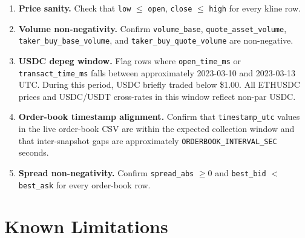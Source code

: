 \documentclass[11pt,a4paper]{article}
\begin{document}
\begin{enumerate}
  \item \textbf{Price sanity.}
        Check that \texttt{low} $\leq$ \texttt{open},
        \texttt{close} $\leq$ \texttt{high} for every kline row.

  \item \textbf{Volume non-negativity.}
        Confirm \texttt{volume\_base}, \texttt{quote\_asset\_volume},
        \texttt{taker\_buy\_base\_volume}, and
        \texttt{taker\_buy\_quote\_volume} are non-negative.

  \item \textbf{USDC depeg window.}
        Flag rows where \texttt{open\_time\_ms} or
        \texttt{transact\_time\_ms} falls between approximately
        2023-03-10 and 2023-03-13 UTC. During this period, USDC
        briefly traded below \$1.00. All ETHUSDC prices and
        USDC/USDT cross-rates in this window reflect non-par USDC.

  \item \textbf{Order-book timestamp alignment.}
        Confirm that \texttt{timestamp\_utc} values in the live
        order-book CSV are within the expected collection window and
        that inter-snapshot gaps are approximately
        \texttt{ORDERBOOK\_INTERVAL\_SEC} seconds.

  \item \textbf{Spread non-negativity.}
        Confirm \texttt{spread\_abs} $\geq 0$ and \texttt{best\_bid}
        $<$ \texttt{best\_ask} for every order-book row.
\end{enumerate}

\section{Known Limitations}
\label{sec:limits}
\end{document}
